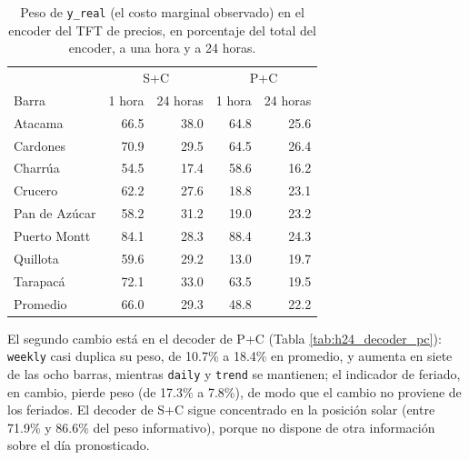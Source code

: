 \begin{table}[htbp]
    \centering
    \begin{tabular}{lrrrr}
        \toprule
        & \multicolumn{2}{c}{S+C} & \multicolumn{2}{c}{P+C} \\
        Barra & 1 hora & 24 horas & 1 hora & 24 horas \\
        \midrule
        Atacama       & 66.5 & 38.0 & 64.8 & 25.6 \\
        Cardones      & 70.9 & 29.5 & 64.5 & 26.4 \\
        Charrúa       & 54.5 & 17.4 & 58.6 & 16.2 \\
        Crucero       & 62.2 & 27.6 & 18.8 & 23.1 \\
        Pan de Azúcar & 58.2 & 31.2 & 19.0 & 23.2 \\
        Puerto Montt  & 84.1 & 28.3 & 88.4 & 24.3 \\
        Quillota      & 59.6 & 29.2 & 13.0 & 19.7 \\
        Tarapacá      & 72.1 & 33.0 & 63.5 & 19.5 \\
        \midrule
        Promedio      & 66.0 & 29.3 & 48.8 & 22.2 \\
        \bottomrule
    \end{tabular}
    \vspace{0.2cm}
    \caption{Peso de \texttt{y\_real} (el costo marginal observado) en el encoder del TFT de precios, en porcentaje del total del encoder, a una hora y a 24 horas.}
    \label{tab:h24_encoder_yreal}
\end{table}

El segundo cambio está en el decoder de P+C (Tabla \ref{tab:h24_decoder_pc}): \texttt{weekly} casi duplica su peso, de 10.7\% a 18.4\% en promedio, y aumenta en siete de las ocho barras, mientras \texttt{daily} y \texttt{trend} se mantienen; el indicador de feriado, en cambio, pierde peso (de 17.3\% a 7.8\%), de modo que el cambio no proviene de los feriados. El decoder de S+C sigue concentrado en la posición solar (entre 71.9\% y 86.6\% del peso informativo), porque no dispone de otra información sobre el día pronosticado.

